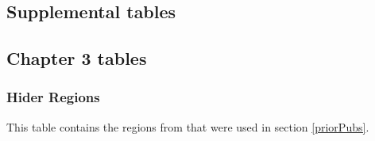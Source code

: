 \documentclass[twoside,openright]{report}
\begin{document}
\begin{appendices}
	\renewcommand{\thesection}{\Alph{chapter}\arabic{section}}
	\renewcommand{\thetable}{S\arabic{table}}
	\renewcommand{\thefigure}{S\arabic{figure}}
	\setcounter{figure}{0}
	\setcounter{table}{0}



\chapter{Supplemental
tables}\label{appendix-a---supplemental-tables}

\section{Chapter 3 tables}\label{chapter-3-tables}

\subsection{Hider Regions}\label{hider-regions}

This table contains the regions from \citet{Hider2013} that were used in
section \ref{priorPubs}.

\begin{landscape}\begingroup\fontsize{8}{10}\selectfont


\end{landscape}
\end{appendices}
\end{document}
